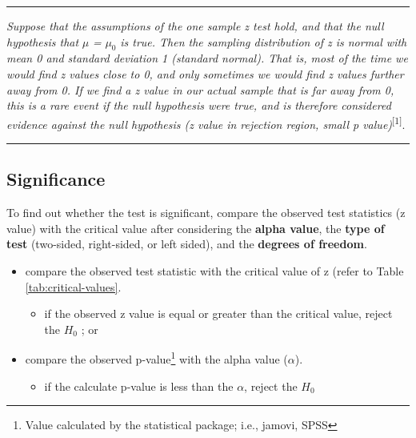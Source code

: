 \documentclass[
]{article}
\providecommand{\tightlist}{%
  \setlength{\itemsep}{0pt}\setlength{\parskip}{0pt}}
\begin{document}
\begin{center}\rule{0.5\linewidth}{0.5pt}\end{center}

\emph{Suppose that the assumptions of the one sample z test hold, and that the null hypothesis that} \(\mu\) \emph{=} \(\mu_0\) \emph{is true. Then the sampling distribution of z is normal with mean 0 and standard deviation 1 (standard normal). That is, most of the time we would find z values close to 0, and only sometimes we would find z values further away from 0. If we find a z value in our actual sample that is far away from 0, this is a rare event if the null hypothesis were true, and is therefore considered evidence against the null hypothesis (z value in rejection region, small p value)}\textsuperscript{{[}1{]}}.

\begin{center}\rule{0.5\linewidth}{0.5pt}\end{center}

\hypertarget{significance}{%
\subsection{Significance}\label{significance}}

To find out whether the test is significant, compare the observed test statistics (z value) with the critical value after considering the \textbf{alpha value}, the \textbf{type of test} (two-sided, right-sided, or left sided), and the \textbf{degrees of freedom}.

\begin{itemize}
\item
  compare the observed test statistic with the critical value of z (refer to Table \ref{tab:critical-values}.

  \begin{itemize}
  \tightlist
  \item
    if the observed z value is equal or greater than the critical value, reject the \(H_0\) ; or
  \end{itemize}
\item
  compare the observed p-value\footnote{Value calculated by the statistical package; i.e., jamovi, SPSS} with the alpha value (\(\alpha\)).

  \begin{itemize}
  \tightlist
  \item
    if the calculate p-value is less than the \(\alpha\), reject the \(H_0\)
  \end{itemize}
\end{itemize}
\end{document}
